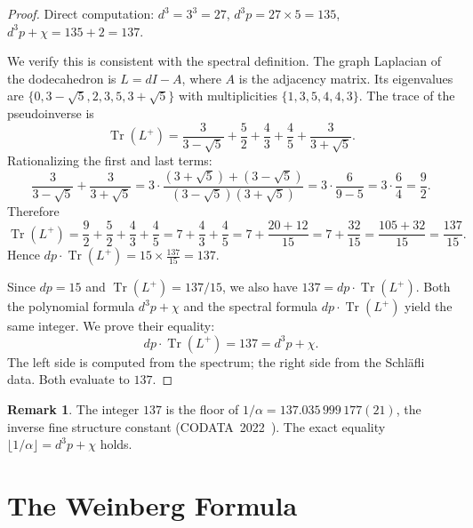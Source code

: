 \documentclass[11pt,a4paper]{article}
\theoremstyle{plain}
\theoremstyle{definition}
\newtheorem{remark}[theorem]{Remark}
\newcommand{\Tr}{\operatorname{Tr}}
\begin{document}
\begin{proof}
Direct computation: $d^{3} = 3^{3} = 27$, $d^{3} p = 27 \times 5 = 135$,
$d^{3} p + \chi = 135 + 2 = 137$.

We verify this is consistent with the spectral definition.  The graph
Laplacian of the dodecahedron is $L = dI - A$, where $A$ is the
adjacency matrix.  Its eigenvalues are
$\{0, 3 - \sqrt{5}, 2, 3, 5, 3 + \sqrt{5}\}$ with multiplicities
$\{1, 3, 5, 4, 4, 3\}$.  The trace of the pseudoinverse is
\begin{equation}\label{eq:trace-pseudoinverse}
  \Tr(L^{+}) = \frac{3}{3-\sqrt{5}} + \frac{5}{2} + \frac{4}{3}
  + \frac{4}{5} + \frac{3}{3+\sqrt{5}}.
\end{equation}
Rationalizing the first and last terms:
\[
  \frac{3}{3-\sqrt{5}} + \frac{3}{3+\sqrt{5}}
  = 3 \cdot \frac{(3+\sqrt{5}) + (3-\sqrt{5})}{(3-\sqrt{5})(3+\sqrt{5})}
  = 3 \cdot \frac{6}{9 - 5}
  = 3 \cdot \frac{6}{4}
  = \frac{9}{2}.
\]
Therefore
\[
  \Tr(L^{+}) = \frac{9}{2} + \frac{5}{2} + \frac{4}{3} + \frac{4}{5}
  = 7 + \frac{4}{3} + \frac{4}{5}
  = 7 + \frac{20 + 12}{15}
  = 7 + \frac{32}{15}
  = \frac{105 + 32}{15}
  = \frac{137}{15}.
\]
Hence $dp \cdot \Tr(L^{+}) = 15 \times \frac{137}{15} = 137$.

Since $dp = 15$ and $\Tr(L^{+}) = 137/15$, we also have
$137 = dp \cdot \Tr(L^{+})$.  Both the polynomial formula
$d^{3}p + \chi$ and the spectral formula $dp \cdot \Tr(L^{+})$ yield
the same integer.  We prove their equality:
\[
  dp \cdot \Tr(L^{+}) = 137 = d^{3}p + \chi.
\]
The left side is computed from the spectrum; the right side from the
Schl\"{a}fli data.  Both evaluate to $137$.
\end{proof}

\begin{remark}\label{rem:137-physics}
The integer $137$ is the floor of $1/\alpha = 137.035\,999\,177(21)$,
the inverse fine structure constant (CODATA~2022~\cite{codata2022}).
The exact equality $\lfloor 1/\alpha \rfloor = d^{3}p + \chi$ holds.
\end{remark}

\section{The Weinberg Formula}\label{sec:formula}
\end{document}

